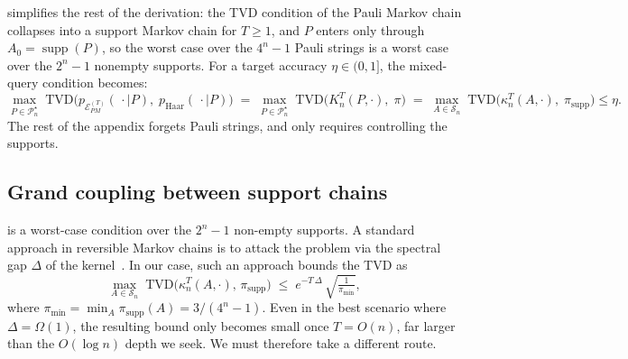 \documentclass[
    aps,
    superscriptaddress,
    onecolumn,
    10pt,
    prx,
    nofootinbib
]{revtex4-2}
\theoremstyle{namedstatement}
\theoremstyle{plain}
\begin{document}
 simplifies the rest of the derivation: the
TVD condition of the Pauli Markov chain collapses into a support Markov
chain for $T\geq 1$, and $P$ enters only through
$A_0=\operatorname{supp}(P)$, so the worst case over the $4^n-1$ Pauli
strings is a worst case over the $2^n-1$ nonempty supports. For a
target accuracy $\eta\in(0,1]$, the mixed-query condition becomes:
\begin{equation}\label{eq:pauli_support_identity}
    \max_{P \in \mathcal{P}_n^\star}\;
    \mathrm{TVD}\Big( p_{\mathcal{E}_{PM}^{(T)}}(\,\cdot \mid P),\; p_{\mathrm{Haar}}(\,\cdot \mid P) \Big)
    \;=\;
    \max_{P \in \mathcal{P}_n^\star}\;
    \mathrm{TVD}\Big( K_n^{T}(P,\cdot),\; \pi \Big)
    \;=\;
    \max_{A \in \mathcal{S}_n}\;
    \mathrm{TVD}\Big( \kappa_n^{T}(A,\cdot),\; \pi_{\mathrm{supp}} \Big)\leq \eta.
\end{equation}
The rest of the appendix forgets Pauli strings, and only requires controlling the supports.


\newpage

\subsection{Grand coupling between support chains} \label{sec:Grand coupling between support chains}
 is a worst-case condition over the $2^n-1$ non-empty supports. A standard approach in reversible Markov chains is to attack the problem via the spectral gap $\Delta$ of the kernel~\cite{LevinPeresWilmer2017}. In our case, such an approach bounds the TVD as
\begin{equation}
    \max_{A\in\mathcal{S}_n}\; \mathrm{TVD}\big(\kappa_n^{T}(A,\cdot),\, \pi_{\mathrm{supp}}\big)
    \;\le\; e^{-T\,\Delta}\, \sqrt{\tfrac{1}{\pi_{\min}}},
\end{equation}
where $\pi_{\min} = \min_{A}\pi_{\mathrm{supp}}(A) = 3/(4^n-1)$. Even in the best scenario where $\Delta = \Omega(1)$, the resulting bound only becomes small once $T = O(n)$, far larger than the $O(\log n)$ depth we seek. We must therefore take a different route.
\end{document}
